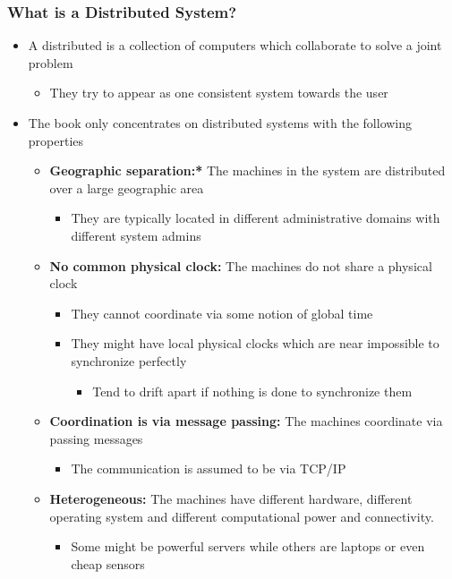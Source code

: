 \documentclass[11pt]{article}
\begin{document}
\subsubsection{What is a Distributed System?}
\label{sec:org5e5b186}
\begin{itemize}
\item A distributed is a collection of computers which collaborate to solve a joint problem
\begin{itemize}
\item They try to appear as one consistent system towards the user
\end{itemize}
\item The book only concentrates on distributed systems with the following properties
\begin{itemize}
\item \textbf{Geographic separation:*} The machines in the system are distributed over a large geographic area 
\begin{itemize}
\item They are typically located in different administrative domains with different system admins
\end{itemize}
\item \textbf{No common physical clock:} The machines do not share a physical clock
\begin{itemize}
\item They cannot coordinate via some notion of global time
\item They might have local physical clocks which are near impossible to synchronize perfectly
\begin{itemize}
\item Tend to drift apart if nothing is done to synchronize them
\end{itemize}
\end{itemize}
\item \textbf{Coordination is via message passing:} The machines coordinate via passing messages
\begin{itemize}
\item The communication is assumed to be via TCP/IP
\end{itemize}
\item \textbf{Heterogeneous:} The machines have different hardware, different operating system and different computational power and connectivity.
\begin{itemize}
\item Some might be powerful servers while others are laptops or even cheap sensors
\end{itemize}
\end{itemize}


\end{itemize}
\end{document}
